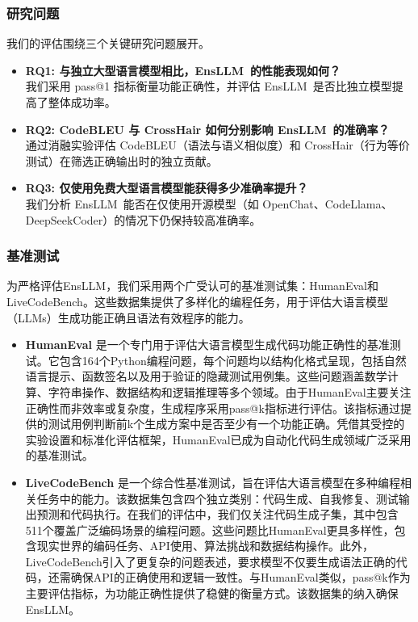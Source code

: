 \documentclass{article}
\newcommand{\tool}{EnsLLM}
\begin{document}
\subsubsection{研究问题}
我们的评估围绕三个关键研究问题展开。
\begin{itemize}
    \item
{\textbf{RQ1: 与独立大型语言模型相比，\tool\ 的性能表现如何？}}
    \\ 我们采用 pass@1 指标衡量功能正确性，并评估 \tool\ 是否比独立模型提高了整体成功率。
    \item
{\textbf{RQ2: CodeBLEU 与 CrossHair 如何分别影响 \tool\ 的准确率？}}
    \\ 通过消融实验评估 CodeBLEU（语法与语义相似度）和 CrossHair（行为等价测试）在筛选正确输出时的独立贡献。
    \item
{\textbf{RQ3: 仅使用免费大型语言模型能获得多少准确率提升？}}
    \\ 我们分析 \tool\ 能否在仅使用开源模型（如 OpenChat、CodeLlama、DeepSeekCoder）的情况下仍保持较高准确率。
\end{itemize}
\subsubsection{基准测试}
\leavevmode\par
为严格评估\tool，我们采用两个广受认可的基准测试集：HumanEval和LiveCodeBench。这些数据集提供了多样化的编程任务，用于评估大语言模型（LLMs）生成功能正确且语法有效程序的能力。

\begin{itemize}
    \item \textbf{HumanEval} \cite{humaneval} 是一个专门用于评估大语言模型生成代码功能正确性的基准测试。它包含164个Python编程问题，每个问题均以结构化格式呈现，包括自然语言提示、函数签名以及用于验证的隐藏测试用例集。这些问题涵盖数学计算、字符串操作、数据结构和逻辑推理等多个领域。由于HumanEval主要关注正确性而非效率或复杂度，生成程序采用pass@k指标进行评估。该指标通过提供的测试用例判断前k个生成方案中是否至少有一个功能正确。凭借其受控的实验设置和标准化评估框架，HumanEval已成为自动化代码生成领域广泛采用的基准测试。

    \item \textbf{LiveCodeBench} \cite{livecodebench} 是一个综合性基准测试，旨在评估大语言模型在多种编程相关任务中的能力。该数据集包含四个独立类别：代码生成、自我修复、测试输出预测和代码执行。在我们的评估中，我们仅关注代码生成子集，其中包含511个覆盖广泛编码场景的编程问题。这些问题比HumanEval更具多样性，包含现实世界的编码任务、API使用、算法挑战和数据结构操作。此外，LiveCodeBench引入了更复杂的问题表述，要求模型不仅要生成语法正确的代码，还需确保API的正确使用和逻辑一致性。与HumanEval类似，pass@k作为主要评估指标，为功能正确性提供了稳健的衡量方式。该数据集的纳入确保\tool{}。
\end{itemize}
\end{document}
